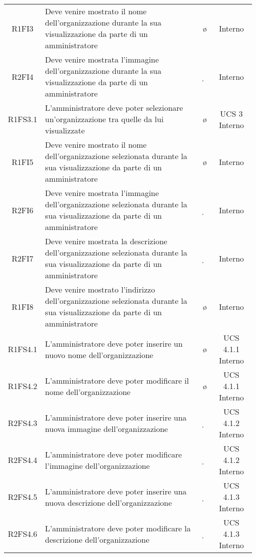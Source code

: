 {\begin{longtable}{ c C{8cm} c c}
R1FI3 & Deve venire mostrato il nome dell'organizzazione durante la sua visualizzazione da parte di un amministratore & \o & Interno\\

R2FI4 & Deve venire mostrata l'immagine dell'organizzazione durante la sua visualizzazione da parte di un amministratore & \d & Interno\\

R1FS3.1 & L'amministratore deve poter selezionare un'organizzazione tra quelle da lui visualizzate & \o & UCS 3 Interno\\

R1FI5 & Deve venire mostrato il nome dell'organizzazione selezionata durante la sua visualizzazione da parte di un amministratore & \o & Interno\\

R2FI6 & Deve venire mostrata l'immagine dell'organizzazione selezionata durante la sua visualizzazione da parte di un amministratore & \d & Interno\\

R2FI7 & Deve venire mostrata la descrizione dell'organizzazione selezionata durante la sua visualizzazione da parte di un amministratore & \d & Interno\\

R1FI8 & Deve venire mostrato l'indirizzo dell'organizzazione selezionata durante la sua visualizzazione da parte di un amministratore & \o & Interno\\

R1FS4.1 & L'amministratore deve poter inserire un nuovo nome dell'organizzazione & \o & UCS 4.1.1 Interno\\

R1FS4.2 & L'amministratore deve poter modificare il nome dell'organizzazione & \o & UCS 4.1.1 Interno\\

R2FS4.3 & L'amministratore deve poter inserire una nuova immagine dell'organizzazione & \d & UCS 4.1.2 Interno\\

R2FS4.4 & L'amministratore deve poter modificare l'immagine dell'organizzazione & \d & UCS 4.1.2 Interno\\

R2FS4.5 & L'amministratore deve poter inserire una nuova descrizione dell'organizzazione & \d & UCS 4.1.3 Interno\\

R2FS4.6 & L'amministratore deve poter modificare la descrizione dell'organizzazione & \d & UCS 4.1.3 Interno\\


\end{longtable}}
